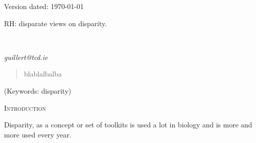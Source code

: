 \documentclass[12pt,letterpaper]{article}
\renewcommand{\section}[1]{%
\bigskip
\begin{center}
\begin{Large}
\normalfont\scshape #1
\medskip
\end{Large}
\end{center}}
\begin{document}
\begin{flushright}
Version dated: \today
\end{flushright}
\bigskip
\noindent RH: disparate views on disparity.

\bigskip
\medskip
\begin{center}

\bigskip

\\
\end{center}
\medskip
{} \textit{guillert@tcd.ie}\\  
\vspace{1in}

\modulolinenumbers[1]
\linenumbers

%
%

\newpage
\begin{abstract}

\begin{enumerate}
    blablalbalba
\end{enumerate}

\end{abstract}

\noindent (Keywords: disparity)\\

\vspace{1.5in}

\newpage 

%
%

\section{Introduction}

Disparity, as a concept or set of toolkits is used a lot in biology and is more and more used every year.
\end{document}
